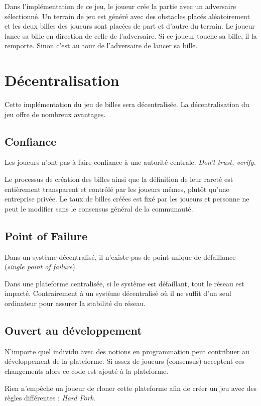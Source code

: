 \documentclass{article}
\begin{document}
Dans l'implémentation de ce jeu, le joueur crée la partie avec un adversaire sélectionné.
Un terrain de jeu est généré avec des obstacles placés aléatoirement et les deux billes des joueurs sont placées de part et d'autre du terrain. Le joueur lance sa bille en direction de celle de l'adversaire. Si ce joueur touche sa bille, il la remporte. Sinon c'est au tour de l'adversaire de lancer sa bille. 


\section{Décentralisation}
Cette implémentation du jeu de billes sera décentralisée. 
La décentralisation du jeu offre de nombreux avantages.

\subsection{Confiance}
Les joueurs n'ont pas à faire confiance à une autorité centrale. 
\textit{Don't trust, verify.}

Le processus de création des billes ainsi que la définition de leur rareté est entièrement transparent et contrôlé par les joueurs mêmes, plutôt qu'une entreprise privée. Le taux de billes créées est fixé par les joueurs et personne ne peut le modifier sans le consensus général de la communauté.

\subsection{Point of Failure}
Dans un système décentralisé, il n'existe pas de point unique de défaillance (\textit{single point of failure}). 

Dans une plateforme centralisée, si le système est défaillant, tout le réseau est impacté. Contrairement à un système décentralisé où il ne suffit d'un seul ordinateur pour assurer la stabilité du réseau.

\subsection{Ouvert au développement}
N'importe quel individu avec des notions en programmation peut contribuer au développement de la plateforme.
Si assez de joueurs (consensus) acceptent ces changements alors ce code est ajouté à la plateforme.

Rien n'empêche un joueur de cloner cette plateforme afin de créer un jeu avec des règles différentes : \textit{Hard Fork}.
\end{document}
